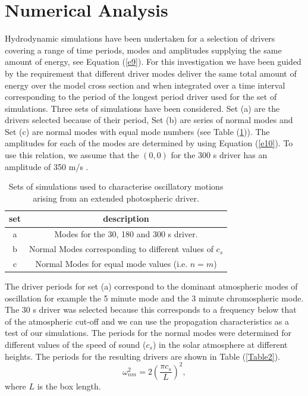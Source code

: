 \documentclass[preprint,authoryear,12pt]{elsarticle}
\begin{document}
\section{Numerical Analysis}
Hydrodynamic simulations have been undertaken for a selection of drivers covering a range of time periods, modes and amplitudes supplying the same amount of energy, see Equation (\ref{e9}). For this investigation we have been guided by the requirement that  different driver modes deliver the same total amount of energy over the model cross section and when integrated over a time interval corresponding to the period of the longest period driver used for the set of simulations. Three sets of simulations have been considered. Set (a) are the drivers selected because of their period, Set (b) are series of normal modes and Set (c) are normal modes with equal mode numbers (see Table (\ref{Table1})). The amplitudes for each of the modes are determined by using  Equation (\ref{e10}). To use this relation, we assume 
that the $(0, 0)$ for the 300 s driver has an amplitude of 350 m/s \citep[see][]{Leighton1960}.
\begin{table}
\centering
\begin{tabular}{c c }
\hline
set   &  description\\
\hline
a &  Modes for the 30, 180 and 300 s driver. \\
\hline
b &  Normal Modes corresponding to different values of $c_s$ \\
\hline
c & Normal Modes for equal mode values (i.e. $n=m$)  \\
\hline
\end{tabular} 
\caption{Sets of simulations used to characterise oscillatory motions arising from an extended photospheric driver.}
\label{Table1}
\end{table}
The driver periods for set (a) correspond to the dominant atmospheric modes of oscillation for example the 5 minute mode and the 3 minute chromospheric mode. The 30 s driver was selected because this corresponds to a frequency below that of the atmospheric cut-off and we can use the propagation characteristics as a test of our simulations. The periods for the normal modes were determined for different values of the speed of sound ($c_s$) in the solar atmosphere at different heights. The periods for the resulting drivers are shown in Table (\ref{Table2}).
$$
\omega_{nm}^{2}= 2\left(\frac{\pi c_{s}}{L} \right)^{2},
$$
where $L$ is the box length.
\end{document}
